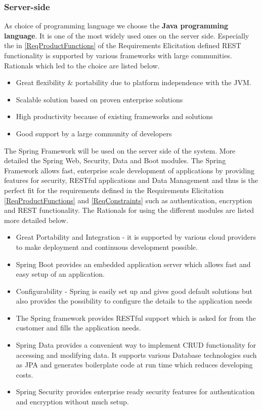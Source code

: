 \documentclass[a4paper,11pt]{article}
\begin{document}
\subsubsection{Server-side}
As choice of programming language we choose the \textbf{Java programming language}. It is one of the most widely used ones on the server side. Especially the  in \ref{ReqProductFunctions} of the Requirements Elicitation defined REST functionality is supported by various frameworks with large communities. Rationals which led to the choice are listed below.
\begin{itemize}
\item Great flexibility \& portability due to platform independence with the JVM.
\item Scalable solution based on proven enterprise solutions
\item High productivity because of existing frameworks and solutions
\item Good support by a large community of developers
\end{itemize}
\noindent
The Spring Framework will be used on the server side of the system.
More detailed the Spring Web, Security, Data and Boot modules. 
The Spring Framework allows fast, enterprise scale development of applications by providing features for security, RESTful applications and Data Management and thus is the perfect fit for the requirements defined in the Requirements Elicitation \ref{ReqProductFunctions} and \ref{ReqConstraints} such as authentication, encryption and REST functionality. The Rationals for using the different modules are listed more detailed below.
\begin{itemize}
\item Great Portability and Integration - it is supported by various cloud providers to make deployment and continuous development possible.
\item Spring Boot provides an embedded application server which allows fast and easy setup of an application.
\item Configurability - Spring is easily set up and gives good default solutions but also provides the possibility to configure the details to the application needs
\item The Spring framework provides RESTful support which is asked for from the customer and fills the application needs.
\item Spring Data provides a convenient way to implement CRUD functionality for accessing and modifying data. It supports various Database technologies such as JPA and generates boilerplate code at run time which reduces developing costs.
\item Spring Security provides enterprise ready security features for authentication and encryption without much setup.
\end{itemize}
\end{document}
